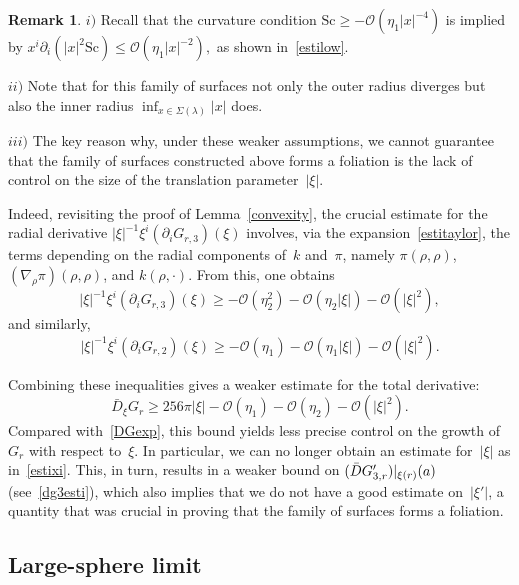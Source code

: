 \documentclass[12pt,a4paper]{amsart}
\theoremstyle{plain}
\theoremstyle{definition}
\newtheorem{remark}[theorem]{Remark}
\begin{document}
\begin{remark}
$i)$ Recall that the curvature condition 
$\mathrm{Sc} \ge -\mathcal{O}(\eta_1 |x|^{-4})$ is implied by 
$x^i \partial_i (|x|^2 \mathrm{Sc}) \le \mathcal{O}(\eta_1 |x|^{-2}),$ as shown in~\eqref{estilow}. 

$ii)$ Note that for this family of surfaces not only the outer radius diverges but also the inner radius  $\inf_{x \in \Sigma(\lambda) } |x|$ does.


$iii)$ The key reason why, under these weaker assumptions, we cannot guarantee that the family of surfaces constructed above forms a foliation  is the lack of control on the size of the translation parameter~$|\xi|$.

Indeed, revisiting the proof of Lemma~\ref{convexity}, the crucial estimate for the radial derivative 
\(|\xi|^{-1}\xi^i(\partial_i G_{r,3})(\xi)\)
involves, via the expansion~\eqref{estitaylor}, the terms depending on the radial components of~$k$ and~$\pi$, namely
\(\pi(\rho,\rho)\), \((\nabla_\rho \pi)(\rho,\rho)\), and \(k(\rho,\cdot)\).
From this, one obtains
\[
|\xi|^{-1} \xi^i (\partial_i G_{r,3})(\xi)
\ge -\mathcal{O}(\eta_2^2) - \mathcal{O}(\eta_2 |\xi|) - \mathcal{O}(|\xi|^2),
\]
and similarly,
\[
|\xi|^{-1} \xi^i (\partial_i G_{r,2})(\xi)
\ge -\mathcal{O}(\eta_1) - \mathcal{O}(\eta_1 |\xi|) - \mathcal{O}(|\xi|^2).
\]

Combining these inequalities gives a weaker estimate for the total derivative:
\begin{equation}\label{estidgcolo}
    \bar{D}_\xi G_r
    \ge 256\pi |\xi|
    - \mathcal{O}(\eta_1)
    - \mathcal{O}(\eta_2)
    - \mathcal{O}(|\xi|^2).
\end{equation}
Compared with~\eqref{DGexp}, this bound yields less precise control on the growth of~$G_r$ with respect to~$\xi$.
In particular, we can no longer obtain an estimate for~$|\xi|$ as in~\eqref{estixi}. 
This, in turn, results in a weaker bound on 
\((\Bar{D} G'_{3,r})|_{\xi(r)}(a)\) (see~\eqref{dg3esti}), 
which also implies that we do not have a good estimate on~$|\xi'|$, 
a quantity that was crucial in proving that the family of surfaces forms a foliation.

\end{remark}







\subsection{Large-sphere limit}
\end{document}
